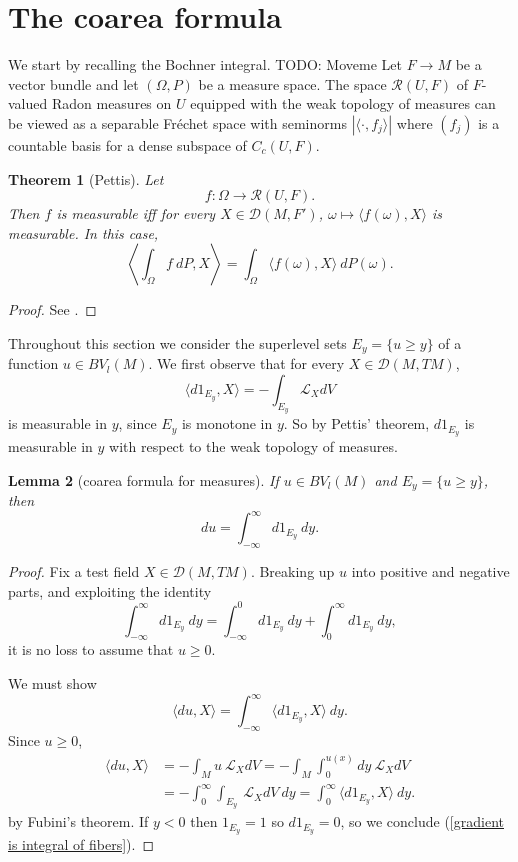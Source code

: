 \documentclass[reqno,12pt,letterpaper]{amsart}
\newtheorem{theorem}{Theorem}[section]
\newtheorem{lemma}[theorem]{Lemma}
\theoremstyle{definition}
\numberwithin{equation}{section}
\begin{document}
\section{The coarea formula} \label{coarea section}
We start by recalling the Bochner integral.
TODO: Moveme
Let $F \to M$ be a vector bundle and let $(\Omega, P)$ be a measure space.
The space $\mathcal R(U, F)$ of $F$-valued Radon measures on $U$ equipped with the weak topology of measures can be viewed as a separable Fr\'echet space with seminorms $|\langle \cdot, f_j\rangle|$ where $(f_j)$ is a countable basis for a dense subspace of $C_c(U, F)$.

\begin{theorem}[Pettis]
Let
$$f: \Omega \to \mathcal R(U, F).$$
Then $f$ is measurable iff for every $X \in \mathcal D(M, F')$, $\omega \mapsto \langle f(\omega), X\rangle$ is measurable.
In this case,
$$\left\langle \int_\Omega f ~dP, X\right\rangle = \int_\Omega \langle f(\omega), X\rangle ~dP(\omega).$$
\end{theorem}
\begin{proof}
See \cite[Chapter V]{yosida2012functional}.
\end{proof}

Throughout this section we consider the superlevel sets $E_y = \{u \geq y\}$ of a function $u \in BV_l(M)$.
We first observe that for every $X \in \mathcal D(M, TM)$,
$$\langle d1_{E_y}, X\rangle = -\int_{E_y} \mathcal L_XdV$$
is measurable in $y$, since $E_y$ is monotone in $y$.
So by Pettis' theorem, $d1_{E_y}$ is measurable in $y$ with respect to the weak topology of measures.

\begin{lemma}[coarea formula for measures]\label{Coarea1}
If $u \in BV_l(M)$ and $E_y = \{u \geq y\}$, then
$$du = \int_{-\infty}^\infty d1_{E_y} ~dy.$$
\end{lemma}
\begin{proof}
Fix a test field $X \in \mathcal D(M, TM)$.
Breaking up $u$ into positive and negative parts, and exploiting the identity
$$\int_{-\infty}^\infty d1_{E_y} ~dy = \int_{-\infty}^0 d1_{E_y} ~dy + \int_0^\infty d1_{E_y} ~dy,$$
it is no loss to assume that $u \geq 0$.

We must show
\begin{equation}
\label{gradient is integral of fibers}
\langle du, X\rangle = \int_{-\infty}^\infty \langle d1_{E_y}, X\rangle ~dy.
\end{equation}
Since $u \geq 0$,
\begin{align*}
\langle du, X\rangle &= -\int_M u~\mathcal L_XdV = -\int_M \int_0^{u(x)} dy ~\mathcal L_XdV\\
&= -\int_0^\infty \int_{E_y} ~\mathcal L_XdV ~dy = \int_0^\infty \langle d1_{E_y}, X\rangle ~dy.
\end{align*}
by Fubini's theorem.
If $y < 0$ then $1_{E_y} = 1$ so $d1_{E_y} = 0$, so we conclude (\ref{gradient is integral of fibers}).
\end{proof}
\end{document}
